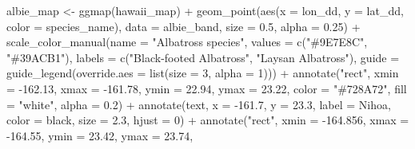 \documentclass[
]{article}
\newenvironment{Shaded}{\begin{snugshade}}{\end{snugshade}}
\newcommand{\AttributeTok}[1]{\textcolor[rgb]{0.77,0.63,0.00}{#1}}
\newcommand{\DecValTok}[1]{\textcolor[rgb]{0.00,0.00,0.81}{#1}}
\newcommand{\FloatTok}[1]{\textcolor[rgb]{0.00,0.00,0.81}{#1}}
\newcommand{\FunctionTok}[1]{\textcolor[rgb]{0.00,0.00,0.00}{#1}}
\newcommand{\NormalTok}[1]{#1}
\newcommand{\OtherTok}[1]{\textcolor[rgb]{0.56,0.35,0.01}{#1}}
\newcommand{\SpecialCharTok}[1]{\textcolor[rgb]{0.00,0.00,0.00}{#1}}
\newcommand{\StringTok}[1]{\textcolor[rgb]{0.31,0.60,0.02}{#1}}
\begin{document}
\begin{Shaded}
\begin{Highlighting}[]
\NormalTok{albie\_map }\OtherTok{\textless{}{-}} \FunctionTok{ggmap}\NormalTok{(hawaii\_map) }\SpecialCharTok{+}
  \FunctionTok{geom\_point}\NormalTok{(}\FunctionTok{aes}\NormalTok{(}\AttributeTok{x =}\NormalTok{ lon\_dd, }\AttributeTok{y =}\NormalTok{ lat\_dd, }\AttributeTok{color =}\NormalTok{ species\_name),}
             \AttributeTok{data =}\NormalTok{ albie\_band,}
             \AttributeTok{size =} \FloatTok{0.5}\NormalTok{,}
             \AttributeTok{alpha =} \FloatTok{0.25}\NormalTok{) }\SpecialCharTok{+}
  \FunctionTok{scale\_color\_manual}\NormalTok{(}\AttributeTok{name =} \StringTok{"Albatross species"}\NormalTok{,}
                     \AttributeTok{values =} \FunctionTok{c}\NormalTok{(}\StringTok{"\#9E7E8C"}\NormalTok{, }\StringTok{"\#39ACB1"}\NormalTok{),}
                     \AttributeTok{labels =} \FunctionTok{c}\NormalTok{(}\StringTok{"Black{-}footed Albatross"}\NormalTok{, }\StringTok{"Laysan Albatross"}\NormalTok{),}
                     \AttributeTok{guide =} \FunctionTok{guide\_legend}\NormalTok{(}\AttributeTok{override.aes =} \FunctionTok{list}\NormalTok{(}\AttributeTok{size =} \DecValTok{3}\NormalTok{, }\AttributeTok{alpha =} \DecValTok{1}\NormalTok{))) }\SpecialCharTok{+}
  \FunctionTok{annotate}\NormalTok{(}\StringTok{"rect"}\NormalTok{, }\AttributeTok{xmin =} \SpecialCharTok{{-}}\FloatTok{162.13}\NormalTok{, }\AttributeTok{xmax =} \SpecialCharTok{{-}}\FloatTok{161.78}\NormalTok{, }\AttributeTok{ymin =} \FloatTok{22.94}\NormalTok{, }\AttributeTok{ymax =} \FloatTok{23.22}\NormalTok{, }
           \AttributeTok{color =} \StringTok{"\#728A72"}\NormalTok{, }\AttributeTok{fill =} \StringTok{"white"}\NormalTok{, }\AttributeTok{alpha =} \FloatTok{0.2}\NormalTok{) }\SpecialCharTok{+}
  \FunctionTok{annotate}\NormalTok{(}\StringTok{\textquotesingle{}text\textquotesingle{}}\NormalTok{, }\AttributeTok{x =} \SpecialCharTok{{-}}\FloatTok{161.7}\NormalTok{, }\AttributeTok{y =} \FloatTok{23.3}\NormalTok{, }
           \AttributeTok{label =} \StringTok{\textquotesingle{}Nihoa\textquotesingle{}}\NormalTok{, }\AttributeTok{color =} \StringTok{\textquotesingle{}black\textquotesingle{}}\NormalTok{, }\AttributeTok{size =} \FloatTok{2.3}\NormalTok{, }\AttributeTok{hjust =} \DecValTok{0}\NormalTok{) }\SpecialCharTok{+}
  \FunctionTok{annotate}\NormalTok{(}\StringTok{"rect"}\NormalTok{, }\AttributeTok{xmin =} \SpecialCharTok{{-}}\FloatTok{164.856}\NormalTok{, }\AttributeTok{xmax =} \SpecialCharTok{{-}}\FloatTok{164.55}\NormalTok{, }\AttributeTok{ymin =} \FloatTok{23.42}\NormalTok{, }\AttributeTok{ymax =} \FloatTok{23.74}\NormalTok{, }

\end{Highlighting}
\end{Shaded}
\end{document}

